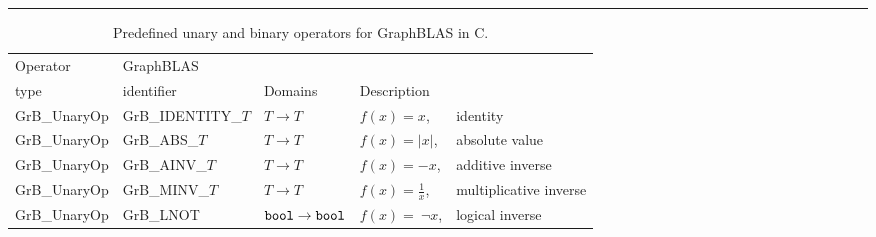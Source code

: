 \begin{table}
\hrule
\begin{center}
\caption{Predefined unary and binary operators for GraphBLAS in C.}
\label{Tab:PredefOperators}
\vspace{1\baselineskip}

\hspace*{-3em}
\begin{tabular}{l|l|l|ll}
Operator & GraphBLAS             &                                                              & \\
type     & identifier            & Domains                                              & Description \\ \hline
{\sf GrB\_UnaryOp}    & {\sf GrB\_IDENTITY\_$T$} & $T \rightarrow T $     & $f(x) = x$, &identity \\
{\sf GrB\_UnaryOp}    & {\sf GrB\_ABS\_$T$}      & $T \rightarrow T $     & $f(x) = |x|$, &absolute value \\
{\sf GrB\_UnaryOp}    & {\sf GrB\_AINV\_$T$}     & $T \rightarrow T $     & $f(x) = -x$, &additive inverse \\
{\sf GrB\_UnaryOp}    & {\sf GrB\_MINV\_$T$}     & $T \rightarrow T $     & $f(x) = \frac{1}{x}$, &multiplicative inverse \\
{\sf GrB\_UnaryOp}    & {\sf GrB\_LNOT}          & ${\tt bool} \rightarrow {\tt bool}$  & $f(x) =~\neg x$, &logical inverse  \\


\end{tabular}
\end{center}
\end{table}
